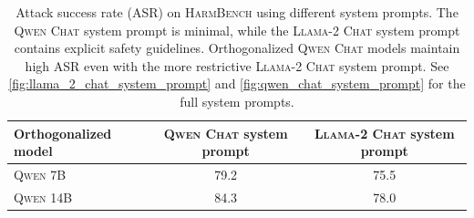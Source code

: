 \documentclass{article}
\begin{document}
\begin{table}[h]
  \caption{Attack success rate (ASR) on \textsc{HarmBench} using different system prompts. The \textsc{Qwen Chat} system prompt is minimal, while the \textsc{Llama-2 Chat} system prompt contains explicit safety guidelines. Orthogonalized \textsc{Qwen Chat} models maintain high ASR even with the more restrictive \textsc{Llama-2 Chat} system prompt. See \autoref{fig:llama_2_chat_system_prompt} and \autoref{fig:qwen_chat_system_prompt} for the full system prompts.}
  \label{tab:system_prompt_comparison}
  \centering
  \begin{tabularx}{0.95\textwidth}{l cc}
  \toprule
  Orthogonalized model & \textsc{Qwen Chat} system prompt & \textsc{Llama-2 Chat} system prompt \\
  \midrule
  \textsc{Qwen 7B} & 79.2 & 75.5 \\
  \textsc{Qwen 14B} & 84.3 & 78.0 \\
  \bottomrule
  \end{tabularx}
\end{table}
\end{document}
